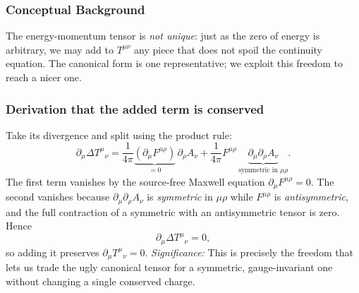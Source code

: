 \subsubsection*{Conceptual Background}
The energy-momentum tensor is \emph{not unique}: just as the zero of energy is arbitrary,
we may add to $T^{\mu\nu}$ any piece that does not spoil the continuity equation. The
canonical form is one representative; we exploit this freedom to reach a nicer one.


\subsubsection*{Derivation that the added term is conserved}
Take its divergence and split using the product rule:
\begin{equation}\label{eq:lec23:added-divergence}
  \partial_\mu\Delta T^{\mu}{}_{\nu}
  =\frac{1}{4\pi}\underbrace{(\partial_\mu F^{\mu\rho})}_{=0}\,\partial_\rho A_\nu
   +\frac{1}{4\pi}F^{\mu\rho}\,\underbrace{\partial_\mu\partial_\rho A_\nu}_{\text{symmetric in }\mu\rho}.
\end{equation}
The first term vanishes by the source-free Maxwell equation $\partial_\mu F^{\mu\rho}=0$.
The second vanishes because $\partial_\mu\partial_\rho A_\nu$ is \emph{symmetric} in
$\mu\rho$ while $F^{\mu\rho}$ is \emph{antisymmetric}, and the full contraction of a
symmetric with an antisymmetric tensor is zero. Hence
\begin{equation}\label{eq:lec23:added-conserved}
  \partial_\mu\Delta T^{\mu}{}_{\nu}=0,
\end{equation}
so adding it preserves $\partial_\mu T^\mu{}_\nu=0$.
\textit{Significance:} This is precisely the freedom that lets us trade the ugly canonical
tensor for a symmetric, gauge-invariant one without changing a single conserved charge.


